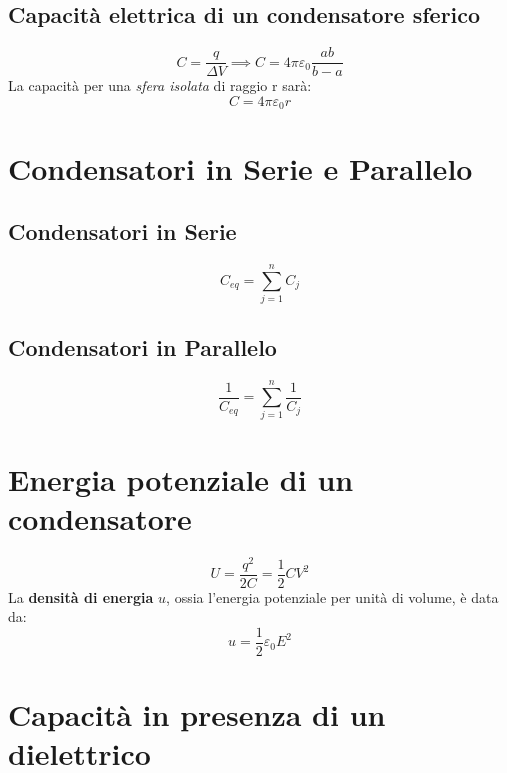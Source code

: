         \subsection*{Capacità elettrica di un condensatore sferico}
            \begin{equation*}
                C = \frac{q}{\Delta V} \implies C = 4\pi\varepsilon_0
                    \frac{ab}{b-a}
            \end{equation*}
        La capacità per una \textit{sfera isolata} di raggio r sarà:
            \begin{equation*}
                C = 4\pi\varepsilon_0r
            \end{equation*}
    
    \section*{Condensatori in Serie e Parallelo} 
        \subsection*{Condensatori in Serie}
            \begin{equation*}
                C_{eq} = \sum_{j = 1}^{n} C_j
            \end{equation*}

        \subsection*{Condensatori in Parallelo}
            \begin{equation*}
                \frac{1}{C_{eq}} = \sum_{j = 1}^{n} \frac{1}{C_j}
            \end{equation*}

    \section*{Energia potenziale di un condensatore}
        \begin{equation*}
            U = \frac{q^2}{2C} = \frac{1}{2}CV^2
        \end{equation*}
    La \textbf{densità di energia} $u$, ossia l'energia potenziale per unità di
     volume, è data da:
        \begin{equation*}
            u = \frac{1}{2}\varepsilon_0E^2
        \end{equation*}
    
    \section*{Capacità in presenza di un dielettrico}
        
